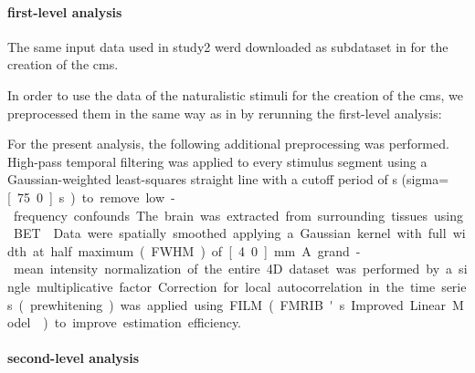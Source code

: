 \paragraph{first-level analysis}


The same input data used in study2 werd downloaded as subdataset in
\citep{ehaeusler2021ppadata} for the creation of the \ac{cms}.

%
In order to use the data of the naturalistic stimuli for the creation of the
\ac{cms}, we preprocessed them in the same way as in
\citep{haeusler2022processing} by rerunning the first-level analysis:


For the present analysis, the following additional preprocessing was performed.
High-pass temporal filtering was applied to every stimulus segment using a
Gaussian-weighted least-squares straight line with a cutoff period of
\unit[150]{s} (sigma=\unit[75.0]{s}) to remove low-frequency confounds.
The brain was extracted from surrounding tissues using BET \citep{smith2002bet}.
Data were spatially smoothed applying a Gaussian kernel with full width at half
maximum (FWHM) of \unit[4.0]{mm}.
A grand-mean intensity normalization of the entire 4D dataset was performed by a
single multiplicative factor.
Correction for local autocorrelation in the time series (prewhitening) was
applied using FILM (FMRIB's Improved Linear Model \citep{woolrich2001autocorr})
to improve estimation efficiency.


\paragraph{second-level analysis}


